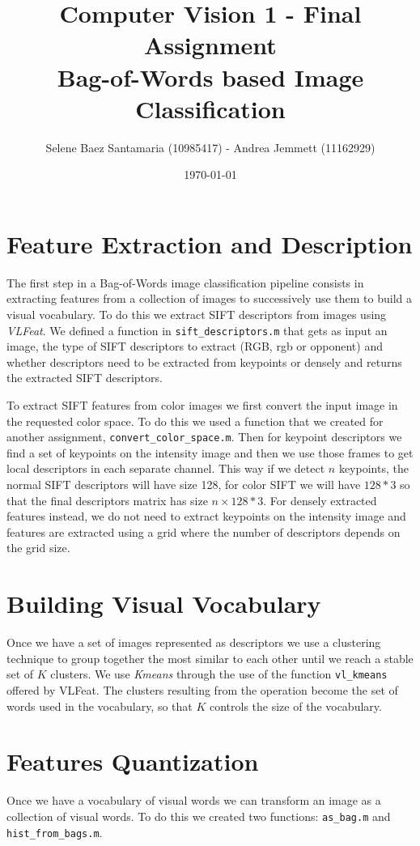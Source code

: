 \documentclass[11pt]{article}
\title{
	{Computer Vision 1 - Final Assignment\\
	 Bag-of-Words based Image Classification}
}
\author{
Selene Baez Santamaria (10985417) - Andrea Jemmett (11162929)}
\date{\today}
\begin{document}
\maketitle


\section{Feature Extraction and Description}
The first step in a Bag-of-Words image classification pipeline consists in
extracting features from a collection of images to successively use them to
build a visual vocabulary. To do this we extract SIFT descriptors from images
using \textit{VLFeat}. We defined a function in \texttt{sift\_descriptors.m}
that gets as input an image, the type of SIFT descriptors to extract (RGB, rgb
or opponent) and whether descriptors need to be extracted from keypoints or
densely and returns the extracted SIFT descriptors.

To extract SIFT features from color images we first convert the input image in
the requested color space. To do this we used a function that we created for
another assignment, \texttt{convert\_color\_space.m}. Then for keypoint
descriptors we find a set of keypoints on the intensity image and then we use
those frames to get local descriptors in each separate channel. This way if we
detect $n$ keypoints, the normal SIFT descriptors will have size 128, for color
SIFT we will have $128*3$ so that the final descriptors matrix has size $n
\times 128*3$.  For densely extracted features instead, we do not need to
extract keypoints on the intensity image and features are extracted using a grid
where the number of descriptors depends on the grid size.


\section{Building Visual Vocabulary}
Once we have a set of images represented as descriptors we use a clustering
technique to group together the most similar to each other until we reach a
stable set of $K$ clusters. We use \textit{Kmeans} through the use of the
function \texttt{vl\_kmeans} offered by VLFeat. The clusters resulting from the
operation become the set of words used in the vocabulary, so that $K$ controls
the size of the vocabulary.


\section{Features Quantization}
Once we have a vocabulary of visual words we can transform an image as a
collection of visual words. To do this we created two functions:
\texttt{as\_bag.m} and \texttt{hist\_from\_bags.m}.
\end{document}
